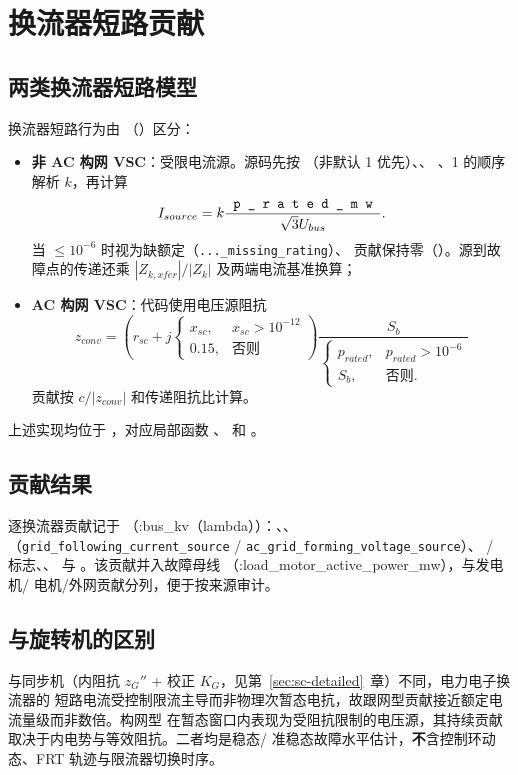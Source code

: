 \section{换流器短路贡献}\label{sec:sc-converter}

\subsection{两类换流器短路模型}
换流器短路行为由 （）区分：
\begin{itemize}
  \item \textbf{非 AC 构网 VSC}：受限电流源。源码先按
        （非默认 1 优先）、、
        、1 的顺序解析 $k$，再计算
        \begin{equation}
        I_{source}=k\frac{\fld{p\_rated\_mw}}{\sqrt3U_{bus}}.
        \end{equation}
        当 $\le10^{-6}$ 时视为缺额定（\texttt{...\_missing\_rating}）、
        贡献保持零（）。源到故障点的传递还乘
        $|Z_{k,xfer}|/|Z_k|$ 及两端电流基准换算；
  \item \textbf{AC 构网 VSC}：代码使用电压源阻抗
        \begin{equation}
        z_{conv}=\left(r_{sc}+j\begin{cases}x_{sc},&x_{sc}>10^{-12}\\0.15,&\text{否则}
        \end{cases}\right)
        \frac{S_b}{\begin{cases}p_{rated},&p_{rated}>10^{-6}\\S_b,&\text{否则}.
        \end{cases}}
        \end{equation}
        贡献按 $c/|z_{conv}|$ 和传递阻抗比计算。
\end{itemize}
上述实现均位于 ，对应局部函数
、 和
。

\subsection{贡献结果}
逐换流器贡献记于 （:bus\_kv（lambda））：、、
（\texttt{grid\_following\_current\_source} / \texttt{ac\_grid\_forming\_voltage\_source}）、
/ 标志、、 与
。该贡献并入故障母线 （:load\_motor\_active\_power\_mw），与发电机/
电机/外网贡献分列，便于按来源审计。

\subsection{与旋转机的区别}
与同步机（内阻抗 $z_G''$ + 校正 $K_G$，见第~\ref{sec:sc-detailed}~章）不同，电力电子换流器的
短路电流受控制限流主导而非物理次暂态电抗，故跟网型贡献接近额定电流量级而非数倍。构网型
在暂态窗口内表现为受阻抗限制的电压源，其持续贡献取决于内电势与等效阻抗。二者均是稳态/
准稳态故障水平估计，\textbf{不}含控制环动态、FRT 轨迹与限流器切换时序。
